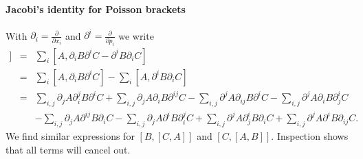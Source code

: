 \documentclass[letterpaper,11pt]{article}
\begin{document}
\paragraph{Jacobi's identity for Poisson brackets}
With $\partial_i = \frac{\partial}{\partial x_i}$ and $\partial^i = \frac{\partial}{\partial p_i}$ we write
\begin{eqnarray*}
 [A,[B,C]] & = & \sum_i [A,\partial_i B \partial^i C - \partial^i B \partial_i C] \\
 & = & \sum_i [A,\partial_i B \partial^i C] - \sum_i [A,\partial^i B \partial_i C] \\
 & = & \sum_{i,j} \partial_j A \partial_i^j B \partial^i C + \sum_{i,j} \partial_j A \partial_i B \partial^{ij} C - \sum_{i,j} \partial^j A \partial_{ij} B \partial^i C - \sum_{i,j} \partial^j A \partial_i B \partial^i_j C \\
 & & - \sum_{i,j} \partial_j A \partial^{ij} B \partial_i C - \sum_{i,j} \partial_j A \partial^i B \partial_i^j C + \sum_{i,j} \partial^j A \partial^i_j B \partial_i C + \sum_{i,j} \partial^j A \partial^i B \partial_{ij} C.
\end{eqnarray*}
We find similar expressions for $[B,[C,A]]$ and $[C,[A,B]]$.  Inspection shows that all terms will cancel out.
\end{document}
